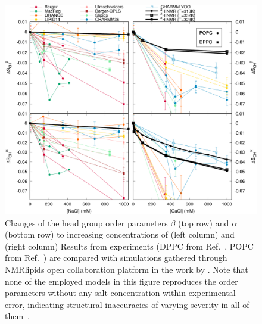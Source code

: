 \begin{figure}[tbp]
  \centering
  \includegraphics[width=\figwidthfull]{../img/OrderParameterIONSchanges.pdf}
  \caption{\label{fig:catte16}
    Changes of the head group order parameters $\beta$ (top row) and $\alpha$ (bottom row) 
    to increasing concentrations of  (left column) and  (right column)
    Results from experiments 
    (DPPC from Ref.~\citep{akutsu81}, POPC from Ref.~\citep{altenbach84}) 
    are compared with simulations gathered through NMRlipids open collaboration platform \citep{nmrlipids} in the work by \citet{catte16}. 
    Note that none of the employed models in this figure reproduces the order parameters without any salt concentration
    within experimental error, indicating structural inaccuracies of varying severity in all of them~\citep{botan15}.
  }
\end{figure}


